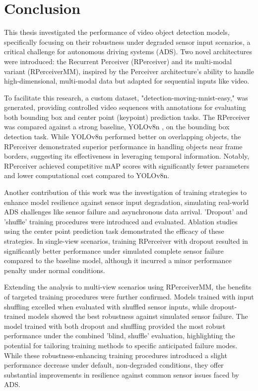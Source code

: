 \section{Conclusion} \label{Conclusion}

This thesis investigated the performance of video object detection models, specifically focusing on their robustness under degraded sensor input scenarios, a critical challenge for autonomous driving systems (ADS). Two novel architectures were introduced: the Recurrent Perceiver (RPerceiver) and its multi-modal variant (RPerceiverMM), inspired by the Perceiver architecture's \cite{jaeglePerceiverGeneralPerception2021} ability to handle high-dimensional, multi-modal data but adapted for sequential inputs like video.

To facilitate this research, a custom dataset, "detection-moving-mnist-easy," was generated, providing controlled video sequences with annotations for evaluating both bounding box and center point (keypoint) prediction tasks.
The RPerceiver was compared against a strong baseline, YOLOv8n \cite{Jocher_Ultralytics_YOLO_2023}, on the bounding box detection task.
While YOLOv8n performed better on overlapping objects, the RPerceiver demonstrated superior performance in handling objects near frame borders, suggesting its effectiveness in leveraging temporal information.
Notably, RPerceiver achieved competitive mAP scores with significantly fewer parameters and lower computational cost compared to YOLOv8n.

Another contribution of this work was the investigation of training strategies to enhance model resilience against sensor input degradation, simulating real-world ADS challenges like sensor failure and asynchronous data arrival.
'Dropout' and 'shuffle' training procedures were introduced and evaluated.
Ablation studies using the center point prediction task demonstrated the efficacy of these strategies. In single-view scenarios, training RPerceiver with dropout resulted in significantly better performance under simulated complete sensor failure compared to the baseline model, although it incurred a minor performance penalty under normal conditions.

Extending the analysis to multi-view scenarios using RPerceiverMM, the benefits of targeted training procedures were further confirmed. Models trained with input shuffling excelled when evaluated with shuffled sensor inputs, while dropout-trained models showed the best robustness against simulated sensor failure.
The model trained with both dropout and shuffling provided the most robust performance under the combined 'blind, shuffle' evaluation, highlighting the potential for tailoring training methods to specific anticipated failure modes.
While these robustness-enhancing training procedures introduced a slight performance decrease under default, non-degraded conditions, they offer substantial improvements in resilience against common sensor issues faced by ADS.

